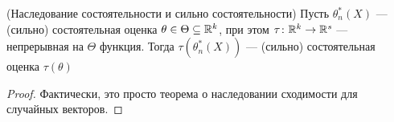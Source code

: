 \begin{proposition} (Наследование состоятельности и сильно состоятельности)
	Пусть $\theta_n^*(X)$ --- (сильно) состоятельная оценка $\theta \in \Theta \subseteq \mathbb{R}^k$, при этом $\tau \colon \mathbb{R}^k \to \mathbb{R}^s$ --- непрерывная на $\Theta$ функция. Тогда $\tau(\theta_n^*(X))$ --- (сильно) состоятельная оценка $\tau(\theta)$
\end{proposition}

\begin{proof}
	Фактически, это просто теорема о наследовании сходимости для случайных векторов.
\end{proof}